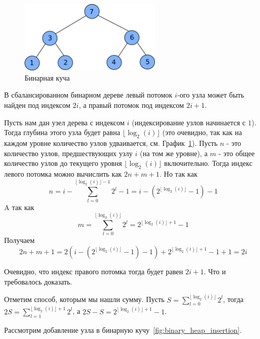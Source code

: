 \begin{figure}
\centering
\includegraphics[width=0.6\textwidth]{graphics/binary_heap.png}
\caption{Бинарная куча}
\label{fig:binary_heap}
\end{figure}

\begin{theorem}
В сбалансированном бинарном дереве левый потомок $i$-ого узла может быть найден под 
индексом $2i$, а правый потомок под индексом $2i+1$.
\end{theorem}

Пусть нам дан узел дерева с индексом $i$ (индексирование узлов начинается с $1$). Тогда глубина этого узла 
будет равна $\lfloor \log_2(i) \rfloor$ (это очевидно, так как на каждом 
уровне количество узлов удваивается, см. График~\ref{fig:binary_heap}). Пусть $n$ - это количество узлов, 
предшествующих узлу $i$ (на том же уровне), а $m$ - это общее количество узлов
до текущего уровня $\lfloor \log_2(i) \rfloor$ включительно. Тогда индекс 
левого потомка можно вычислить как $2n + m+1$. Но так как
$$n = i - \sum_{l=0}^{\lfloor \log_2(i) \rfloor - 1} 2^l - 1 = i - (2^{\lfloor \log_2(i) \rfloor} - 1) - 1$$ 
A так как
$$m=\sum_{l=0}^{\lfloor \log_2(i) \rfloor} 2^l = 2^{\lfloor \log_2(i) \rfloor + 1} - 1$$
Получаем
$$2n+m+1= 2(i - (2^{\lfloor \log_2(i) \rfloor} - 1) - 1) + 2^{\lfloor \log_2(i) \rfloor + 1} - 1 + 1 = 2i$$ 

Очевидно, что индекс правого потомка тогда будет равен $2i+1$.
Что и требовалось доказать.

Отметим способ, которым мы нашли сумму. Пусть $S=\sum_{l=0}^{\lfloor \log_2(i) \rfloor} 2^l$, тогда 
$2S=\sum_{l=1}^{\lfloor \log_2(i) \rfloor + 1} 2^l$, а $2S-S = 2^{\lfloor \log_2(i) \rfloor + 1} - 1$.


Рассмотрим добавление узла в бинарную кучу~\ref{fig:binary_heap_insertion}.

